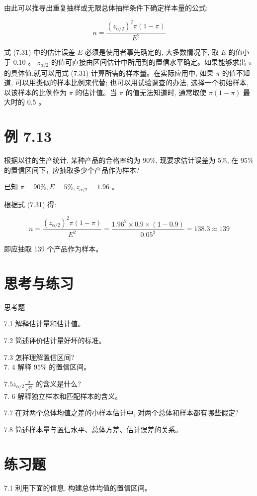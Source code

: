 \documentclass[10pt]{article}
\begin{document}
\begin{CJK*}{UTF8}{bsmi}
由此可以推导出重复抽样或无限总体抽样条件下确定样本量的公式:


\begin{equation*}
n=\frac{\left(z_{\alpha / 2}\right)^{2} \pi(1-\pi)}{E^{2}} \tag{7.31}
\end{equation*}


式 (7.31) 中的估计误差 $E$ 必须是使用者事先确定的, 大多数情况下, 取 $E$ 的值小于 0.10 。 $z_{\alpha / 2}$ 的值可直接由区间估计中所用到的置信水平确定。如果能够求出 $\pi$ 的具体值,就可以用式 (7.31) 计算所需的样本量。在实际应用中, 如果 $\pi$ 的值不知道, 可以用类似的样本比例来代替; 也可以用试验调查的办法, 选择一个初始样本, 以该样本的比例作为 $\pi$ 的估计值。当 $\pi$ 的值无法知道时, 通常取使 $\pi(1-\pi)$ 最大时的 0.5 。

\section*{例 7.13}
根据以往的生产统计, 某种产品的合格率约为 90\%, 现要求估计误差为 5\%, 在 $95 \%$的置信区间下，应抽取多少个产品作为样本?

已知 $\pi=90 \%, E=5 \%, z_{\alpha / 2}=1.96$ 。

根据式 (7.31) 得:

$$
n=\frac{\left(z_{\alpha / 2}\right)^{2} \pi(1-\pi)}{E^{2}}=\frac{1.96^{2} \times 0.9 \times(1-0.9)}{0.05^{2}}=138.3 \approx 139
$$

即应抽取 139 个产品作为样本。

\section*{思考与练习}
思考题

7.1 解释估计量和估计值。

7.2 简述评价估计量好坏的标准。

7.3 怎样理解置信区间?\\
7. 4 解释 $95 \%$ 的置信区间。

$7.5 z_{\alpha / 2} \frac{\sigma}{\sqrt{n}}$ 的含义是什么?\\
7. 6 解释独立样本和匹配样本的含义。

7.7 在对两个总体均值之差的小样本估计中, 对两个总体和样本都有哪些假定?

7.8 简述样本量与置信水平、总体方差、估计误差的关系。

\section*{练习题}
7.1 利用下面的信息, 构建总体均值的置信区间。


\end{CJK*}
\end{document}
